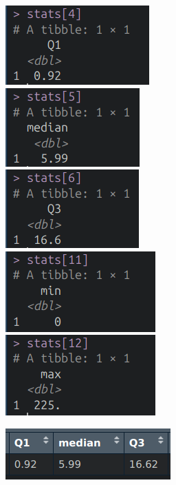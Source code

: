 \documentclass[polish]{article}
\begin{document}
    \begin{center}
        \includegraphics[scale=0.8]{img/q1.png} \\
        \includegraphics[scale=0.8]{img/q2.png} \\
        \includegraphics[scale=0.8]{img/q3.png} \\
        \includegraphics[scale=0.8]{img/min.png} \\
        \includegraphics[scale=0.8]{img/max.png} \\
    \end{center}

    \begin{center}
        \includegraphics{img/quantiles.png}
    \end{center}
\end{document}

